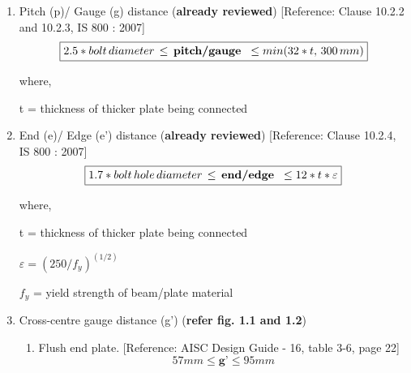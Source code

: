 \documentclass[11.5pt,a4paper,oneside]{report}
\begin{document}
\begin{Form}
			\begin{enumerate}
				
				\item \large  {Pitch (p)/ Gauge (g) distance (\textbf{already reviewed}) [Reference: Clause 10.2.2 and 10.2.3, IS 800 : 2007]} \\
				\begin{equation}
				\boxed{ 2.5 * bolt\, diameter\, \leq \textbf{\,pitch/gauge \,} \leq min(32 * t,\, 300\, mm) }
				\end{equation}
				
				\hspace{10mm}
				where,
				
				\hspace{30mm}
				t = thickness of thicker plate being connected 
				
			\vspace{2mm}
				
				\item \large {End (e)/ Edge (e') distance (\textbf{already reviewed}) [Reference: Clause 10.2.4, IS 800 : 2007]} \\
				\begin{equation}
				\boxed{ 1.7 * bolt\,hole\, diameter\, \leq \textbf{\,end/edge \,} \leq 12*t*\varepsilon }
				\end{equation}
				
				\hspace{10mm}
				where,
				
				\hspace{30mm}
				t = thickness of thicker plate being connected
				
				\hspace{30mm}
				$\varepsilon = (250 / f_{y}) ^ {(1/2)}$ 
				
				\hspace{30mm}
				$f_{y}$ = yield strength of beam/plate material 				 
			
			\vspace{2mm}
				
				\item \large {Cross-centre gauge distance (g')} (\textbf{refer fig. 1.1 and 1.2}) \\
					\begin{enumerate}
						\item Flush end plate. [Reference: AISC Design Guide - 16, table 3-6, page 22]
						\begin{equation}
						\boxed{ 57 mm \leq \textbf{g'} \leq 95 mm }
						\end{equation}
						

\end{enumerate}
\end{enumerate}
\end{Form}
\end{document}
